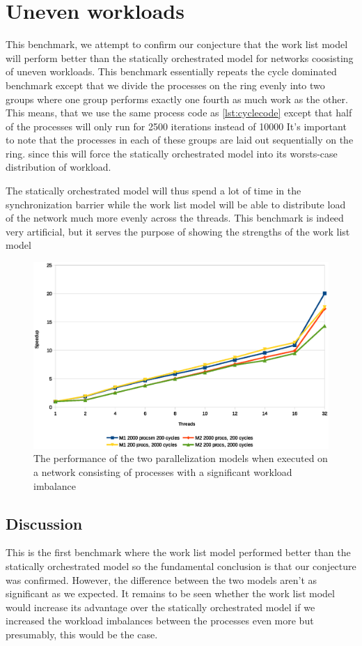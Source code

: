 \section{Uneven workloads}
This benchmark, we attempt to confirm our conjecture that the work
list model will perform better than the statically orchestrated model
for networks coosisting of uneven workloads. This benchmark
essentially repeats the cycle dominated benchmark except that we
divide the processes on the ring evenly into two groups where one
group performs exactly one fourth as much work as the other. This
means, that we use the same process code as \cref{lst:cyclecode}
except that half of the processes will only run for 2500 iterations
instead of 10000 It's important to note that the processes in each of
these groups are laid out sequentially on the ring. since this will force the
statically orchestrated model into its worsts-case distribution of
workload.

The statically orchestrated model will thus spend a lot of time in the
synchronization barrier while the work list model will be able to
distribute load of the network much more evenly across the
threads. This benchmark is indeed very artificial, but it serves the
purpose of showing the strengths of the work list model

\begin{figure}
\centering
\includegraphics[width=\textwidth]{graphs/uneven}
\caption[Benchmark of uneven workloads]{The performance of the two
  parallelization models when executed on a network consisting of
  processes with a significant workload imbalance}
\label{fig:uneven}
\end{figure}

\subsection{Discussion}
This is the first benchmark where the work list model performed better
than the statically orchestrated model so the fundamental conclusion
is that our conjecture was confirmed. However, the difference between
the two models aren't as significant as we expected. It remains to be
seen whether the work list model would increase its advantage over the
statically orchestrated model if we increased the workload imbalances
between the processes even more but presumably, this would be the
case.

